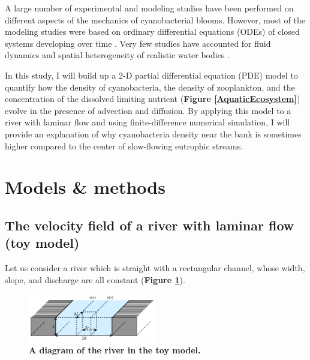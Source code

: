 \documentclass{article}
\begin{document}
A large number of experimental and modeling studies have been performed on different aspects of the mechanics of cyanobacterial blooms. However, most of the modeling studies were based on ordinary differential equations (ODEs) of closed systems developing over time \cite{SteeleHenderson, DumitranVuta}. Very few studies have accounted for fluid dynamics and spatial heterogeneity of realistic water bodies \cite{2D-B, ZhaoTianWei}.

In this study, I will build up a 2-D partial differential equation (PDE) model to quantify how the density of cyanobacteria, the density of zooplankton, and the concentration of the dissolved limiting nutrient (\textbf{Figure \ref{AquaticEcosystem}}) evolve in the presence of advection and diffusion. By applying this model to a river with laminar flow and using finite-difference numerical simulation, I will provide an explanation of why cyanobacteria density near the bank is sometimes higher compared to the center of slow-flowing eutrophic streams.

\section*{Models \& methods}
\subsection*{The velocity field of a river with laminar flow (toy model)}
Let us consider a river which is straight with a rectangular channel, whose width, slope, and discharge are all constant (\textbf{Figure \ref{ToyRiverVelocityProfile}}).

\begin{figure}[h]
    \centering
    \captionsetup{justification=centering}
    \includegraphics[width=0.5\textwidth]{ToyRiverDiagram.pdf}
    \caption{\textbf{A diagram of the river in the toy model.}}
    \label{ToyRiverVelocityProfile}
\end{figure}
\end{document}
